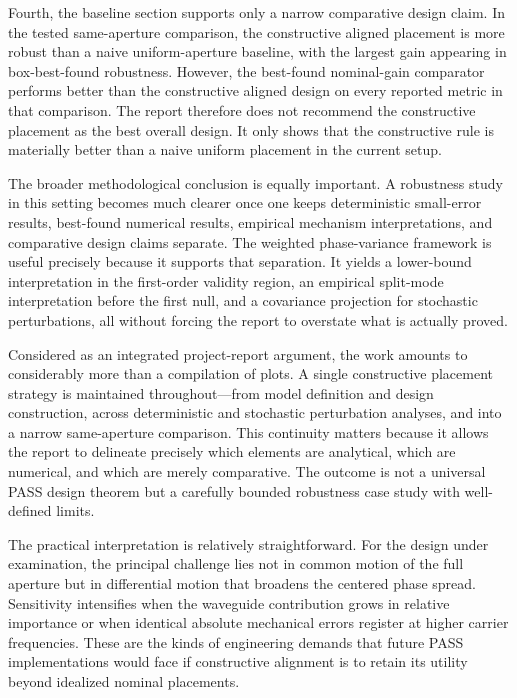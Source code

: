 Fourth, the baseline section supports only a narrow comparative design claim. In the tested same-aperture comparison, the constructive aligned placement is more robust than a naive uniform-aperture baseline, with the largest gain appearing in box-best-found robustness. However, the best-found nominal-gain comparator performs better than the constructive aligned design on every reported metric in that comparison. The report therefore does not recommend the constructive placement as the best overall design. It only shows that the constructive rule is materially better than a naive uniform placement in the current setup.

The broader methodological conclusion is equally important. A robustness study in this setting becomes much clearer once one keeps deterministic small-error results, best-found numerical results, empirical mechanism interpretations, and comparative design claims separate. The weighted phase-variance framework is useful precisely because it supports that separation. It yields a lower-bound interpretation in the first-order validity region, an empirical split-mode interpretation before the first null, and a covariance projection for stochastic perturbations, all without forcing the report to overstate what is actually proved.

Considered as an integrated project-report argument, the work amounts to considerably more than a compilation of plots. A single constructive placement strategy is maintained throughout—from model definition and design construction, across deterministic and stochastic perturbation analyses, and into a narrow same-aperture comparison. This continuity matters because it allows the report to delineate precisely which elements are analytical, which are numerical, and which are merely comparative. The outcome is not a universal PASS design theorem but a carefully bounded robustness case study with well-defined limits.

The practical interpretation is relatively straightforward. For the design under examination, the principal challenge lies not in common motion of the full aperture but in differential motion that broadens the centered phase spread. Sensitivity intensifies when the waveguide contribution grows in relative importance or when identical absolute mechanical errors register at higher carrier frequencies. These are the kinds of engineering demands that future PASS implementations would face if constructive alignment is to retain its utility beyond idealized nominal placements.

